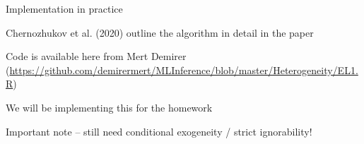 \documentclass[notes,11pt, aspectratio=169]{beamer}
\newenvironment{wideitemize}{\itemize\addtolength{\itemsep}{10pt}}{\enditemize}
\begin{document}
\begin{frame}{Implementation in practice}
  \begin{wideitemize}
  \item Chernozhukov et al. (2020) outline the algorithm in detail in the paper
  \item Code is available here from Mert Demirer
    (\url{https://github.com/demirermert/MLInference/blob/master/Heterogeneity/EL1.R})
  \item We will be implementing this for the homework
  \item Important note -- still need conditional exogeneity / strict ignorability!
  \end{wideitemize}
  
\end{frame}
\end{document}
